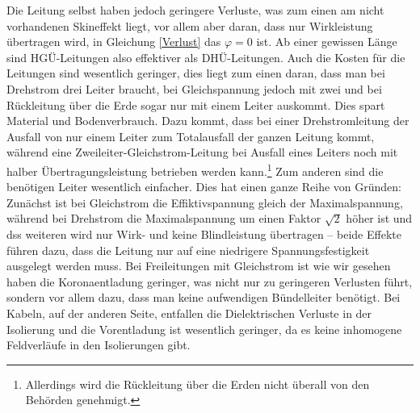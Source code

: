 Die Leitung selbst haben jedoch geringere Verluste, was zum einen am nicht vorhandenen Skineffekt liegt, vor allem aber daran, dass nur Wirkleistung übertragen wird, in Gleichung \ref{Verlust} das $\varphi=0$ ist. Ab einer gewissen Länge sind HGÜ-Leitungen also effektiver als DHÜ-Leitungen.
Auch die Kosten für die Leitungen sind wesentlich geringer, dies liegt zum einen daran, dass man bei Drehstrom drei Leiter braucht, bei Gleichspannung jedoch mit zwei und bei Rückleitung über die Erde sogar nur mit einem Leiter auskommt. Dies spart Material und Bodenverbrauch. %
Dazu kommt, dass bei einer Drehstromleitung der Ausfall von nur einem Leiter zum Totalausfall der ganzen Leitung kommt, während eine Zweileiter-Gleichstrom-Leitung bei Ausfall eines Leiters noch mit halber Übertragungsleistung betrieben werden kann.\cite{Schymroch}\footnote{Allerdings wird die Rückleitung über die Erden nicht überall von den Behörden genehmigt.}%
Zum anderen sind die benötigen Leiter wesentlich einfacher. Dies hat einen ganze Reihe von Gründen:
Zunächst ist bei Gleichstrom die Effiktivspannung gleich der Maximalspannung, während bei Drehstrom die Maximalspannung um einen Faktor $\sqrt{2}$ höher ist und dss weiteren wird nur Wirk- und keine Blindleistung übertragen -- beide Effekte führen dazu, dass die Leitung nur auf eine niedrigere Spannungsfestigkeit ausgelegt werden muss. %
Bei Freileitungen mit Gleichstrom ist wie wir gesehen haben die Koronaentladung geringer, was nicht nur zu geringeren Verlusten führt, sondern vor allem dazu, dass man keine aufwendigen Bündelleiter benötigt.
Bei Kabeln, auf der anderen Seite, entfallen die Dielektrischen Verluste in der Isolierung und die Vorentladung ist wesentlich geringer, da es keine inhomogene Feldverläufe in den Isolierungen gibt. %

